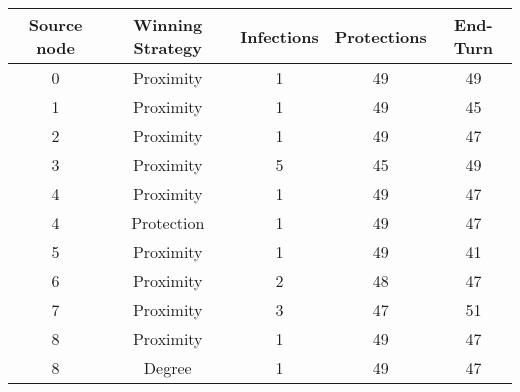 \documentclass[results.tex]{subfiles}
\begin{document}
    \begin{center}
        \begin{tabular}{| c || c | c | c | c |}
            \hline
            {\bfseries Source node} & {\bfseries Winning Strategy} & {\bfseries Infections} & {\bfseries Protections}
            & {\bfseries End-Turn}
            \\  %
            \hline\hline
            0                       & Proximity                    & 1                      & 49                      & 49                   \\
            \hline
            1                       & Proximity                    & 1                      & 49                      & 45                   \\
            \hline
            2                       & Proximity                    & 1                      & 49                      & 47                   \\
            \hline
            3                       & Proximity                    & 5                      & 45                      & 49                   \\
            \hline
            4                       & Proximity                    & 1                      & 49                      & 47                   \\
            \hline
            4                       & Protection                   & 1                      & 49                      & 47                   \\
            \hline
            5                       & Proximity                    & 1                      & 49                      & 41                   \\
            \hline
            6                       & Proximity                    & 2                      & 48                      & 47                   \\
            \hline
            7                       & Proximity                    & 3                      & 47                      & 51                   \\
            \hline
            8                       & Proximity                    & 1                      & 49                      & 47                   \\
            \hline
            8                       & Degree                       & 1                      & 49                      & 47                   \\

\end{tabular}
\end{center}
\end{document}
